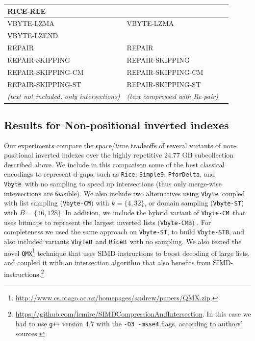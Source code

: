\documentclass[review]{elsarticle}
\newcommand{\vbyte}{\texttt{Vbyte}}
\newcommand{\vbyteB}{\texttt{VbyteB}}
\newcommand{\rice}{\texttt{Rice}}
\newcommand{\riceB}{\texttt{RiceB}}
\newcommand{\simplen}{\texttt{Simple9}}
\newcommand{\pfordelta}{\texttt{PforDelta}}
\newcommand{\qmx}{\texttt{QMX}}
\newcommand{\vbyteCM}{\texttt{Vbyte-CM}}
\newcommand{\vbyteCMB}{\texttt{Vbyte-CMB}}
\newcommand{\vbyteST}{\texttt{Vbyte-ST}}
\newcommand{\vbyteSTB}{\texttt{Vbyte-STB}}
\begin{document}
\begin{table}[htbp]
\begin{center}
\begin{tabular}{|l|l|l|}
	RICE-RLE                  &                          &  \\ \hline
	VBYTE-LZMA                &  VBYTE-LZMA              &  \\ \hline
	VBYTE-LZEND               &                          &  \\ \hline
	REPAIR                    &  REPAIR                  &  \\ \hline
	REPAIR-SKIPPING           &  REPAIR-SKIPPING         &  \\ \hline
	REPAIR-SKIPPING-CM        &  REPAIR-SKIPPING-CM      &  \\ \hline
	REPAIR-SKIPPING-ST        &  REPAIR-SKIPPING-ST      &  \\ \hline
	\hline
	\textit{(text not included, only intersections)} & \textit{(text compressed with Re-pair)} &  \\ 
		\hline
	\end{tabular}
	\label{tab:techniques}
	\end{center}
\end{table}





\subsection{Results for Non-positional inverted indexes}

Our experiments compare the space/time tradeoffs of several variants of 
non-positional inverted indexes over the highly repetitive 24.77 GB subcollection described above. We include in this comparison some of the best classical encodings to represent d-gaps, such as \rice, \simplen, 
\pfordelta, and \vbyte\ with no sampling to speed up intersections (thus only merge-wise intersections are feasible). 
We also include two alternatives using \vbyte\ coupled with list sampling \cite{CM10} (\vbyteCM) with $k=\{4,32\}$, or domain sampling \cite{TS10} (\vbyteST) with $B=\{16,128\}$. In addition, we include the hybrid variant of \vbyteCM\ that uses bitmaps to represent the largest inverted lists (\vbyteCMB) \cite{CM10}. For completeness we used the same approach on \vbyteST, to build \vbyteSTB, and also included variants \vbyteB\ and \riceB\ with no sampling.
We also tested the novel \qmx\footnote{\url{http://www.cs.otago.ac.nz/homepages/andrew/papers/QMX.zip}. } technique \cite{trotman2014} that uses SIMD-instructions to boost decoding of large lists, and coupled it with an intersection algorithm \cite{Lemire2015:simdInt} that also benefits from SIMD-instructions.\footnote{ \url{https://github.com/lemire/SIMDCompressionAndIntersection}. In this case we had to use \texttt{g++} version 4.7 with the \texttt{-O3 -msse4} flags, according to authors' sources.}
\end{document}
